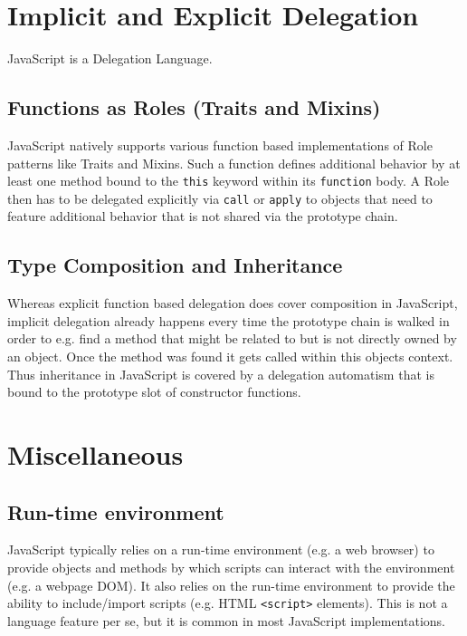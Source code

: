 \section{Implicit and Explicit Delegation}



JavaScript is a Delegation Language.



\subsection{Functions as Roles (Traits and Mixins)}


JavaScript natively supports various function based implementations of Role patterns like Traits and Mixins. Such a function defines additional behavior by at least one method bound to the \texttt{this} keyword within its \texttt{function} body. A Role then has to be delegated explicitly via \texttt{call} or \texttt{apply} to objects that need to feature additional behavior that is not shared via the prototype chain.



\subsection{Type Composition and Inheritance}



Whereas explicit function based delegation does cover composition in JavaScript, implicit delegation already happens every time the prototype chain is walked in order to e.g. find a method that might be related to but is not directly owned by an object. Once the method was found it gets called within this objects context. Thus inheritance in JavaScript is covered by a delegation automatism that is bound to the prototype slot of constructor functions.



\section{Miscellaneous}



\subsection{Run-time environment}

JavaScript typically relies on a run-time environment (e.g. a web browser) to provide objects and methods by which scripts can interact with the environment (e.g. a webpage DOM). It also relies on the run-time environment to provide the ability to include/import scripts (e.g. HTML \texttt{<script>} elements). This is not a language feature per se, but it is common in most JavaScript implementations.


